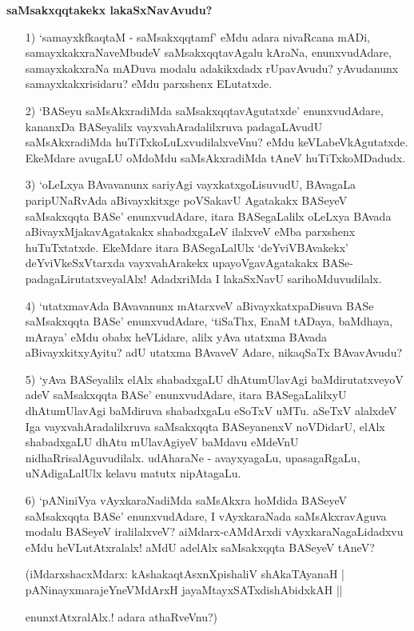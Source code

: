 \bigskip
\noindent
{\large\bf saMsakxqqtakekx lakaSxNavAvudu?}\label{page2}
\smallskip
\begin{itemize}
\item[1)] `samayxkfkaqtaM - saMsakxqqtamf' eMdu adara nivaRcana mADi, samayxkakxraNa\-veMbudeV saMsakxqqta\-vAgalu kAraNa, enunxvudAdare, samayxkakxraNa mADuva modalu adakikxdadx rUpavAvudu? yAvudanunx samayxkakxrisi\-daru? eMdu parxshenx ELutatxde.

\item[2)] `BASeyu saMsAkxradiMda saMsakxqqtavAgutatxde' enunxvudAdare, kananxDa BASe\-yalilx vayxva\-hAra\-dalilx\-ruva pada\-gaLAvudU saMsAkxradiMda huTiTxkoLuLxvu\-dilalxveVnu? eMdu keVLabeVkAgutatxde. EkeM\-dare \-avu\-gaLU oMdoMdu saMsAkxradiMda tAneV huTiTxkoMDadudx.

\item[3)] `oLeLxya BAvavanunx sariyAgi vayxkatxgoLisuvudU, BAvagaLa paripUNaR\-vAda aBivayxkitxge poVSa\-kavU Aga\-takakx BASeyeV saMsakxqqta BASe' enunxvu\-dAdare, itara BASegaLalilx oLeLxya BAvada aBi\-vayxMjaka\-vAga\-takakx shabadxgaLeV ilalxveV eMba parxshenx huTuTxtatxde. EkeMdare itara BASegaLalUlx `deYviVBAvakekx' deYviV\-keSxVtarxda vayxvahArakekx upayoVgavAgatakakx BASe-padagaLirutatxveyalAlx! AdadxriMda I lakaSx\-NavU\- sarihoM\-duvudilalx.



\item[4)] `utatxmavAda BAvavanunx mAtarxveV aBivayxkatxpaDisuva BASe saMsakxqqta BASe' enunxvudAdare, `tiSaThx,\- EnaM tADaya, baMdhaya, mAraya' eMdu obabx heVLidare, alilx yAva utatxma BAvada aBivayxkitx\-yAyitu? adU utatxma BAvaveV Adare, nikaqSaTx BAvavAvudu?

\vfill\eject

\item[5)] `yAva BASeyalilx elAlx shabadxgaLU dhAtumUlavAgi baMdirutatxveyoV adeV saMsakxqqta BASe' enunxvudAdare, itara BASegaLalilxyU dhAtumUla\-vAgi baMdiruva shabadxgaLu eSoTxV uMTu. aSeTxV alalxdeV Iga vayxvahAradalilxruva saMsakxqqta BASeyanenxV noVDidarU, elAlx shabadxgaLU dhAtu mUla\-vAgiyeV baMdavu eMdeVnU nidhaRrisalAguvudilalx. udAharaNe - avayxyagaLu, upasagaRgaLu, uNAdigaLalUlx kelavu matutx nipAtagaLu.

\item[6)] `pANiniVya vAyxkaraNadiMda saMsAkxra hoMdida BASeyeV saMsakxqqta BASe' enunxvudAdare, I vAyxkaraNada saMsAkxravAguva modalu BASeyeV iralilalxveV? aiMdarx-cAMdArxdi vAyxkaraNagaLidadxvu eMdu heVLutAtxralalx! aMdU adelAlx saMsakxqqta BASeyeV tAneV?

\begin{shloka}
(iMdarxshacxMdarx: kAshakaqtAsxnXpishaliV shAkaTAyanaH |\\\label{3}
pANinayxmarajeYneVMdArxH jayaMtayxSATxdishAbidxkAH ||
\end{shloka}
enunxtAtxralAlx.! adara athaRveVnu?)
\end{itemize}

